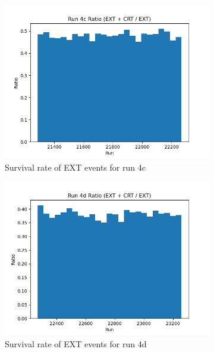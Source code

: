 \begin{figure}[H]
    \begin{subfigure}[t]{0.3\linewidth}
        \includegraphics[width=\linewidth]{technote/EventSelections/FiguresCRT/run4cfortalk.png}%
        \caption{Survival rate of EXT events for run 4c}
    \end{subfigure}
    \hspace{0.3cm}%
    \begin{subfigure}[t]{0.3\linewidth}
        \includegraphics[width=\linewidth]{technote/EventSelections/FiguresCRT/run4dfortalk.png}%
        \caption{Survival rate of EXT events for run 4d}
    \end{subfigure}
    \hspace{0.3cm}%
    \begin{subfigure}[t]{0.3\linewidth}

\end{subfigure}
\end{figure}

